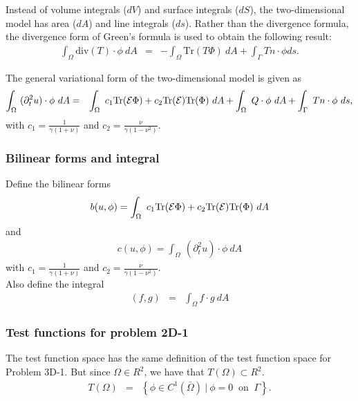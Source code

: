 \documentclass[../../main.tex]{subfiles}
\begin{document}
Instead of volume integrals ($dV$) and surface integrals ($dS$), the two-dimensional model has area ($dA$) and line integrals ($ds$). Rather than the divergence formula, the divergence form of Green's formula is used to obtain the following result:\label{sym:dV}\label{sym:dS}\label{sym:dA}\label{sym:ds}
\begin{eqnarray*}
	\int_{\Omega} \textrm{div}(T)\cdot \phi \ dA & = & -\int_{\Omega} \textrm{Tr}(T\Phi) \ dA + \int_{\Gamma} Tn\cdot \phi ds.
\end{eqnarray*}

The general variational form of the two-dimensional model is given as
\begin{eqnarray*}
	\int_\Omega~ (\partial^2_t u) \cdot \phi~dA & = & \int_\Omega~c_1\textrm{Tr}({\cal E}\Phi)+ c_2\textrm{Tr}({\cal E})
	\textrm{Tr}(\Phi) ~dA + \int_\Omega~ Q \cdot \phi~dA
	+ \int_\Gamma~Tn \cdot \phi~ds,
\end{eqnarray*}
with $\displaystyle c_1 = \frac{1}{\gamma(1+\nu)}$ and $\displaystyle c_2 = \frac{\nu}{\gamma(1-\nu^2)}$.

\subsubsection{Bilinear forms and integral}\label{sssec:2D_Model:BilinearForm}
Define the bilinear forms
\begin{eqnarray}
	b(u,\phi) = \int_\Omega~c_1\textrm{Tr}({\cal E}\Phi)+ c_2\textrm{Tr}({\cal E})
	\textrm{Tr}(\Phi) ~dA \label{eq:2D_Model:Bilinear}
\end{eqnarray}
and
\begin{eqnarray}
	c(u,\phi) = \int_\Omega~ (\partial^2_t u) \cdot \phi~dA \label{eq:2D_Model:Bilinear_c}
\end{eqnarray}
with $\displaystyle c_1 = \frac{1}{\gamma(1+\nu)}$ and $\displaystyle c_2 = \frac{\nu}{\gamma(1-\nu^2)}$.\\
Also define the integral
\begin{eqnarray}
	(f,g) &=& \int_{\Omega} f\cdot g \ dA \label{eq:2D_Model:Bilinear_int}
\end{eqnarray}

\subsubsection{Test functions for problem 2D-1}\label{sssec:2D_Model:TestFunctions2D1}
The test function space has the same definition of the test function space for Problem 3D-1. But since $\Omega \in R^2$, we have that $T(\Omega) \subset R^2$.
\begin{eqnarray*}
	T(\Omega) & = & \left\{ \phi \in C^1(\bar{\Omega}) \ | \ \phi = 0 \ \textrm{ on } \ \Gamma \right\}. 
\end{eqnarray*}\label{sym:baromega}
\end{document}

